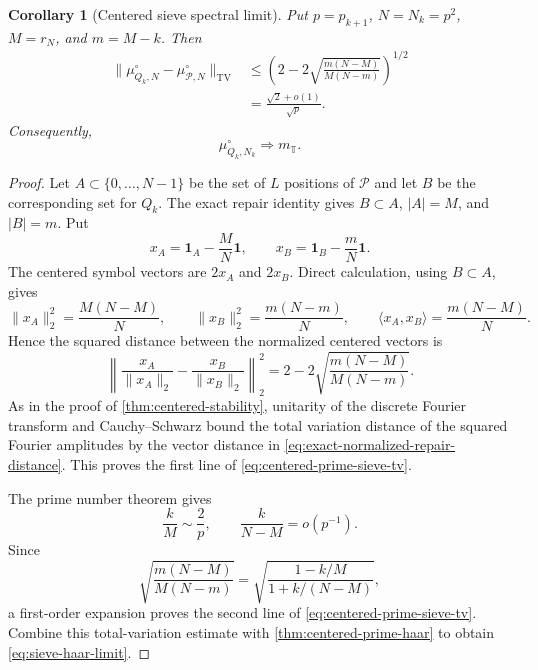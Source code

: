 \documentclass[11pt]{article}
\newtheorem{corollary}[theorem]{Corollary}
\theoremstyle{definition}
\theoremstyle{remark}
\newcommand{\T}{\mathbb{T}}
\newcommand{\cP}{\mathcal{P}}
\newcommand{\TV}{\mathrm{TV}}
\newcommand{\one}{\mathbf{1}}
\begin{document}
\begin{corollary}[Centered sieve spectral limit]\label{cor:centered-sieve-haar}
Put $p=p_{k+1}$, $N=N_k=p^2$, $M=r_N$, and $m=M-k$.  Then
\begin{equation}\label{eq:centered-prime-sieve-tv}
\begin{split}
    \|\mu^{\circ}_{Q_k,N}-\mu^{\circ}_{\cP,N}\|_{\TV}
    &\le
    \left(
      2-2\sqrt{\frac{m(N-M)}{M(N-m)}}
    \right)^{1/2}\\
    &=\frac{\sqrt2+o(1)}{\sqrt p}.
\end{split}
\end{equation}
Consequently,
\begin{equation}\label{eq:sieve-haar-limit}
    \mu^{\circ}_{Q_k,N_k}\Rightarrow m_{\T}.
\end{equation}
\end{corollary}

\begin{proof}
Let $A\subset\{0,\ldots,N-1\}$ be the set of $L$ positions of $\cP$ and let $B$ be the corresponding set for $Q_k$.  The exact repair identity gives $B\subset A$, $|A|=M$, and $|B|=m$.  Put
\[
    x_A=\one_A-\frac MN\one,
    \qquad
    x_B=\one_B-\frac mN\one.
\]
The centered symbol vectors are $2x_A$ and $2x_B$.  Direct calculation, using $B\subset A$, gives
\[
    \|x_A\|_2^2=\frac{M(N-M)}N,
    \qquad
    \|x_B\|_2^2=\frac{m(N-m)}N,
    \qquad
    \langle x_A,x_B\rangle=\frac{m(N-M)}N.
\]
Hence the squared distance between the normalized centered vectors is
\begin{equation}\label{eq:exact-normalized-repair-distance}
    \left\|
      \frac{x_A}{\|x_A\|_2}-\frac{x_B}{\|x_B\|_2}
    \right\|_2^2
    =2-2\sqrt{\frac{m(N-M)}{M(N-m)}}.
\end{equation}
As in the proof of \cref{thm:centered-stability}, unitarity of the discrete Fourier transform and Cauchy--Schwarz bound the total variation distance of the squared Fourier amplitudes by the vector distance in \eqref{eq:exact-normalized-repair-distance}.  This proves the first line of \eqref{eq:centered-prime-sieve-tv}.

The prime number theorem gives
\[
    \frac{k}{M}\sim\frac2p,
    \qquad
    \frac{k}{N-M}=o(p^{-1}).
\]
Since
\[
    \sqrt{\frac{m(N-M)}{M(N-m)}}
    =\sqrt{\frac{1-k/M}{1+k/(N-M)}},
\]
a first-order expansion proves the second line of \eqref{eq:centered-prime-sieve-tv}.  Combine this total-variation estimate with \cref{thm:centered-prime-haar} to obtain \eqref{eq:sieve-haar-limit}.
\end{proof}
\end{document}
